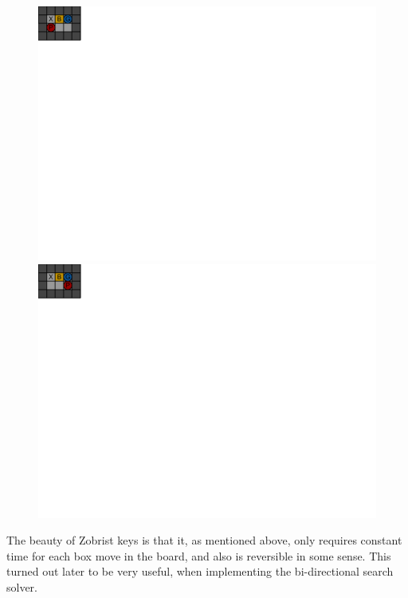 \documentclass[a4paper,11pt]{article}
\renewcommand{\*}[0]{\cdot}
\begin{document}
\begin{figure}[h!]
    \begin{center}
        \includegraphics{figures/equalState1}
        \includegraphics{figures/equalState2}
    \end{center}
    \caption{} %
    \label{fig:equalStatesDifferentHash}
\end{figure}


The beauty of Zobrist keys is that it, as mentioned above, only requires
constant time for each box move in the board, and also is reversible in some
sense. This turned out later to be very useful, when implementing the
bi-directional search solver.
\end{document}

